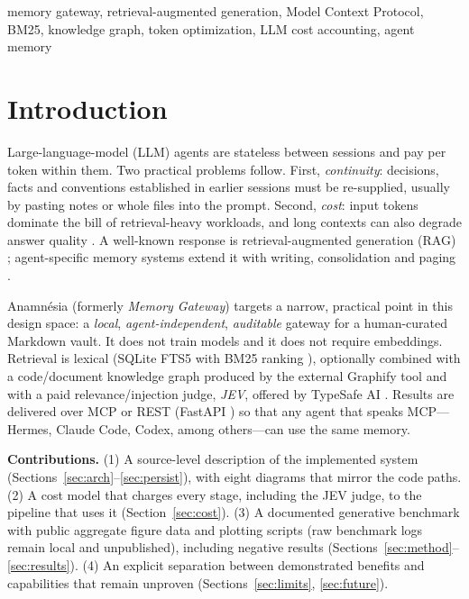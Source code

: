 \documentclass[conference,onecolumn,11pt]{IEEEtran}
\newcommand{\anam}{Anam\-n\'esia}
\begin{document}
\begin{IEEEkeywords}
memory gateway, retrieval-augmented generation, Model Context Protocol, BM25, knowledge graph, token optimization, LLM cost accounting, agent memory
\end{IEEEkeywords}

\section{Introduction}
Large-language-model (LLM) agents are stateless between sessions and pay per token within them. Two practical problems follow. First, \emph{continuity}: decisions, facts and conventions established in earlier sessions must be re-supplied, usually by pasting notes or whole files into the prompt. Second, \emph{cost}: input tokens dominate the bill of retrieval-heavy workloads, and long contexts can also degrade answer quality \cite{liu2024lostmiddle}. A well-known response is retrieval-augmented generation (RAG) \cite{lewis2020rag,gao2023ragsurvey}; agent-specific memory systems extend it with writing, consolidation and paging \cite{packer2023memgpt,park2023generative,zhong2024memorybank,chhikara2025mem0}.

\anam{} (formerly \emph{Memory Gateway}) targets a narrow, practical point in this design space: a \emph{local}, \emph{agent-independent}, \emph{auditable} gateway for a human-curated Markdown vault. It does not train models and it does not require embeddings. Retrieval is lexical (SQLite FTS5 with BM25 ranking \cite{sqlitefts5,robertson2009bm25}), optionally combined with a code/document knowledge graph produced by the external Graphify tool \cite{graphify} and with a paid relevance/injection judge, \emph{JEV}, offered by TypeSafe AI \cite{typesafedocs}. Results are delivered over MCP \cite{mcpspec} or REST (FastAPI \cite{fastapi}) so that any agent that speaks MCP---Hermes, Claude Code, Codex, among others---can use the same memory.

\textbf{Contributions.} (1) A source-level description of the implemented system (Sections~\ref{sec:arch}--\ref{sec:persist}), with eight diagrams that mirror the code paths. (2) A cost model that charges every stage, including the JEV judge, to the pipeline that uses it (Section~\ref{sec:cost}). (3) A documented generative benchmark with public aggregate figure data and plotting scripts (raw benchmark logs remain local and unpublished), including negative results (Sections~\ref{sec:method}--\ref{sec:results}). (4) An explicit separation between demonstrated benefits and capabilities that remain unproven (Sections~\ref{sec:limits}, \ref{sec:future}).
\end{document}
